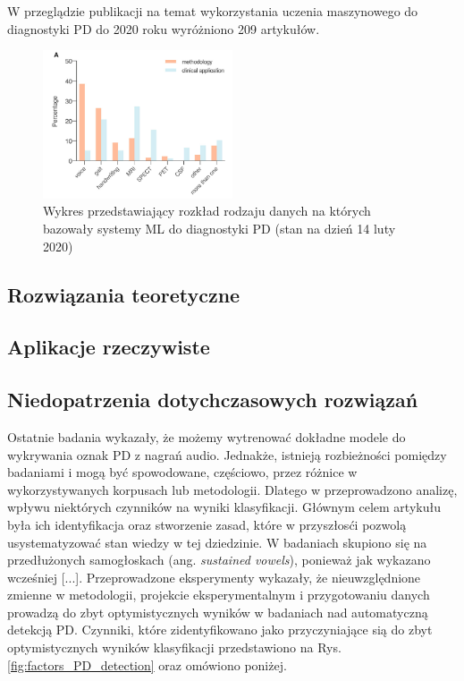 W przeglądzie publikacji na temat wykorzystania uczenia maszynowego do diagnostyki PD do 2020 roku wyróżniono 209 artykułów\cite{ML_for_PD_review}.


\begin{figure}[htbp]
	\centering
	\includegraphics[width=0.5\textwidth]{./img/plot_PD_detection_methods}
	\caption{Wykres przedstawiający rozkład rodzaju danych na których bazowały systemy ML do diagnostyki PD\cite{ML_for_PD_review} (stan na dzień 14 luty 2020)}
    \label{fig:pd_detection_methods}\label{fig:figure}
\end{figure}


\subsection{Rozwiązania teoretyczne}
\label{subsec:rozwiazania-teoretyczne}

\subsection{Aplikacje rzeczywiste}
\label{subsec:aplikacje}


\subsection{Niedopatrzenia dotychczasowych rozwiązań}
\label{subsec:wady_rozwiazan}

Ostatnie badania wykazały, że możemy wytrenować dokładne modele do wykrywania oznak PD z nagrań audio.
Jednakże, istnieją rozbieżności pomiędzy badaniami i mogą być spowodowane, częściowo, przez różnice w
wykorzystywanych korpusach lub metodologii.
Dlatego w  \cite{SustainedVowelsProblems} przeprowadzono analizę, wpływu niektórych czynników na wyniki klasyfikacji.
Głównym celem artykułu była ich identyfikacja oraz stworzenie zasad, które w przyszłosći pozwolą usystematyzować
stan wiedzy w tej dziedzinie.
W badaniach skupiono się na przedłużonych samogłoskach (ang. \emph{sustained vowels}), ponieważ jak wykazano wcześniej
[...].
Przeprowadzone eksperymenty wykazały, że nieuwzględnione zmienne w metodologii, projekcie eksperymentalnym i
przygotowaniu danych prowadzą do zbyt optymistycznych wyników w badaniach nad automatyczną detekcją PD.
Czynniki, które zidentyfikowano jako przyczyniające sią do zbyt optymistycznych wyników klasyfikacji
przedstawiono na Rys. \ref{fig:factors_PD_detection} oraz omówiono poniżej.


